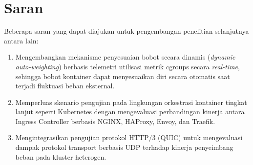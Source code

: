 \section{Saran}
Beberapa saran yang dapat diajukan untuk pengembangan penelitian selanjutnya antara lain:
\begin{enumerate}
    \item Mengembangkan mekanisme penyesuaian bobot secara dinamis (\textit{dynamic auto-weighting}) berbasis telemetri utilisasi metrik cgroups secara \textit{real-time}, sehingga bobot kontainer dapat menyesuaikan diri secara otomatis saat terjadi fluktuasi beban eksternal.
    \item Memperluas skenario pengujian pada lingkungan orkestrasi kontainer tingkat lanjut seperti Kubernetes dengan mengevaluasi perbandingan kinerja antara Ingress Controller berbasis NGINX, HAProxy, Envoy, dan Traefik.
    \item Mengintegrasikan pengujian protokol HTTP/3 (QUIC) untuk mengevaluasi dampak protokol transport berbasis UDP terhadap kinerja penyeimbang beban pada kluster heterogen.
\end{enumerate}
